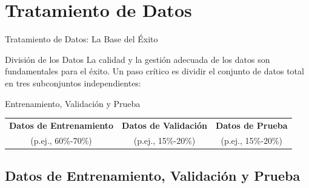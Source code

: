 \documentclass[aspectratio=169,xcolor=dvipsnames]{beamer}
\begin{document}
\section{Tratamiento de Datos}

\begin{frame}{Tratamiento de Datos: La Base del Éxito}
    \begin{block}{División de los Datos}
    La calidad y la gestión adecuada de los datos son fundamentales para el éxito. Un paso crítico es dividir el conjunto de datos total en tres subconjuntos independientes:
    \end{block}
    
    \begin{alertblock}{Entrenamiento, Validación y Prueba}
    \begin{center}
    \begin{tabular}{|c|c|c|}
    \hline
    \textbf{Datos de Entrenamiento} & \textbf{Datos de Validación} & \textbf{Datos de Prueba} \\
    (p.ej., 60\%-70\%) & (p.ej., 15\%-20\%) & (p.ej., 15\%-20\%) \\ \hline
    \end{tabular}
    \end{center}
    \end{alertblock}
\end{frame}

\subsection{Datos de Entrenamiento, Validación y Prueba}
\end{document}
